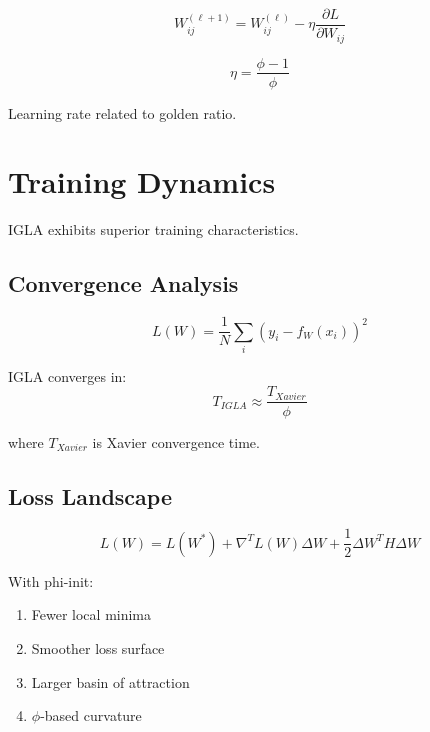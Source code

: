 \begin{equation}
W_{ij}^{(\ell+1)} = W_{ij}^{(\ell)} - \eta \frac{\partial L}{\partial W_{ij}}
\end{equation}

\begin{proposition}
\label{prop:golden-lr}
\begin{equation}
\eta = \frac{\phi - 1}{\phi}
\end{equation}

Learning rate related to golden ratio.
\end{proposition}

\section{Training Dynamics}

IGLA exhibits superior training characteristics.

\subsection{Convergence Analysis}

\begin{definition}
\label{def:loss}
\begin{equation}
L(W) = \frac{1}{N}\sum_i (y_i - f_W(x_i))^2
\end{equation}
\end{definition}

\begin{theorem}
\label{thm:golden-convergence}
IGLA converges in:
\begin{equation}
T_{IGLA} \approx \frac{T_{Xavier}}{\phi}
\end{equation}

where $T_{Xavier}$ is Xavier convergence time.
\end{theorem}

\subsection{Loss Landscape}

\begin{equation}
L(W) = L(W^*) + \nabla^T L(W)\Delta W + \frac{1}{2}\Delta W^T H \Delta W
\end{equation}

\begin{proposition}
\label{prop:golden-opt}
With phi-init:
\begin{enumerate}
\item Fewer local minima
\item Smoother loss surface
\item Larger basin of attraction
\item $\phi$-based curvature
\end{enumerate}
\end{proposition}

